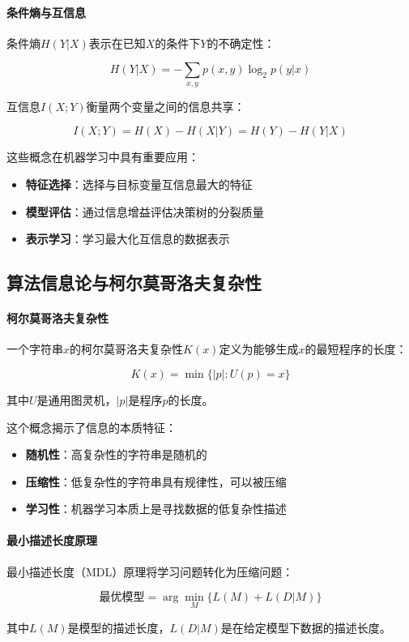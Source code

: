 \paragraph{条件熵与互信息}
条件熵$H(Y|X)$表示在已知$X$的条件下$Y$的不确定性：

$$H(Y|X) = -\sum_{x,y} p(x,y) \log_2 p(y|x)$$

互信息$I(X;Y)$衡量两个变量之间的信息共享：

$$I(X;Y) = H(X) - H(X|Y) = H(Y) - H(Y|X)$$

这些概念在机器学习中具有重要应用：
\begin{itemize}
\item \textbf{特征选择}：选择与目标变量互信息最大的特征
\item \textbf{模型评估}：通过信息增益评估决策树的分裂质量
\item \textbf{表示学习}：学习最大化互信息的数据表示
\end{itemize}

\subsection{算法信息论与柯尔莫哥洛夫复杂性}

\paragraph{柯尔莫哥洛夫复杂性}
一个字符串$x$的柯尔莫哥洛夫复杂性$K(x)$定义为能够生成$x$的最短程序的长度：

$$K(x) = \min\{|p| : U(p) = x\}$$

其中$U$是通用图灵机，$|p|$是程序$p$的长度。

这个概念揭示了信息的本质特征：
\begin{itemize}
\item \textbf{随机性}：高复杂性的字符串是随机的
\item \textbf{压缩性}：低复杂性的字符串具有规律性，可以被压缩
\item \textbf{学习性}：机器学习本质上是寻找数据的低复杂性描述
\end{itemize}

\paragraph{最小描述长度原理}
最小描述长度（MDL）原理将学习问题转化为压缩问题：

$$\text{最优模型} = \arg\min_M \{L(M) + L(D|M)\}$$

其中$L(M)$是模型的描述长度，$L(D|M)$是在给定模型下数据的描述长度。

